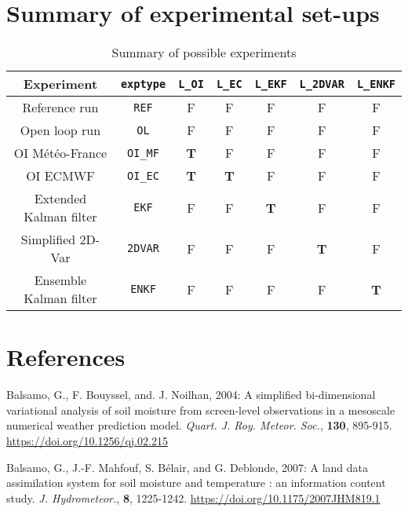 \documentclass[12pt]{article}
\newcommand{\bc}{\begin{center}}
\newcommand{\ec}{\end{center}}
\begin{document}
{{{\section{Summary of experimental set-ups}
\begin{table}[h]
\bc
\begin{tabular}{|c|c|c|c|c|c|c|}
\hline
Experiment & {\tt exptype} & {\tt L\_OI} & {\tt L\_EC} & {\tt L\_EKF} & {\tt L\_2DVAR} & {\tt L\_ENKF} \\
\hline
Reference run & {\tt REF} & F & F & F & F & F \\
\hline
Open loop run & {\tt OL} & F & F & F & F & F \\
\hline
OI M\'et\'eo-France & {\tt OI\_MF} & \bf{T} & F & F & F & F \\
\hline
OI ECMWF & {\tt OI\_EC} & \bf{T} & \bf{T} & F & F & F \\
\hline
Extended Kalman filter & {\tt EKF}  & F & F & \bf{T} & F & F \\
\hline
Simplified 2D-Var & {\tt 2DVAR} & F & F & F & \bf{T} & F \\
\hline
Ensemble Kalman filter & {\tt ENKF} & F & F & F & F & \bf{T} \\
\hline
\end{tabular}
\caption{Summary of possible experiments}
\ec
\end{table}
\newpage
\section{References}
\begin{description}
\item Balsamo, G., F. Bouyssel, and. J. Noilhan, 2004:
A simplified bi-dimensional variational analysis of soil moisture from
screen-level observations in a mesoscale numerical weather prediction model.
{\it Quart. J. Roy. Meteor. Soc.}, {\bf 130}, 895-915.
\url{https://doi.org/10.1256/qj.02.215}



\item Balsamo, G., J.-F. Mahfouf, S. B\'elair, and G. Deblonde, 2007:
A land data assimilation system for soil moisture and temperature : an
information content study. {\it J. Hydrometeor.}, {\bf 8}, 1225-1242.
\url{https://doi.org/10.1175/2007JHM819.1}


\end{description}}}}
\end{document}
